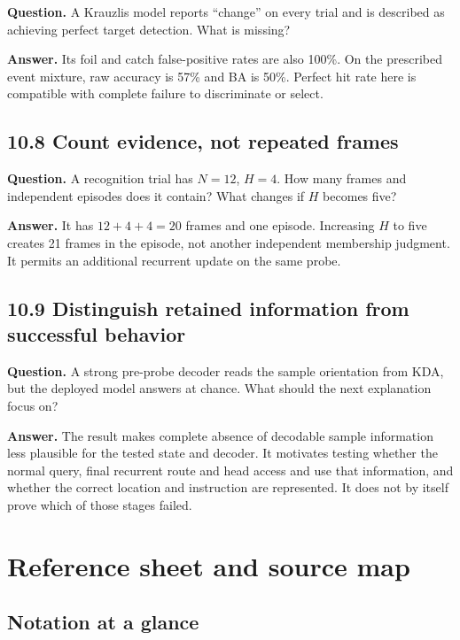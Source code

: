 \documentclass[
  11pt,
]{article}
\let\oldsubsection\subsection
\renewcommand{\subsection}{\Needspace{6\baselineskip}\oldsubsection}
\begin{document}
\textbf{Question.} A Krauzlis model reports ``change'' on every trial
and is described as achieving perfect target detection. What is missing?

\textbf{Answer.} Its foil and catch false-positive rates are also 100\%.
On the prescribed event mixture, raw accuracy is 57\% and BA is 50\%.
Perfect hit rate here is compatible with complete failure to
discriminate or select.

\subsection{10.8 Count evidence, not repeated
frames}\label{count-evidence-not-repeated-frames}

\textbf{Question.} A recognition trial has \(N=12\), \(H=4\). How many
frames and independent episodes does it contain? What changes if \(H\)
becomes five?

\textbf{Answer.} It has \(12+4+4=20\) frames and one episode. Increasing
\(H\) to five creates 21 frames in the episode, not another independent
membership judgment. It permits an additional recurrent update on the
same probe.

\subsection{10.9 Distinguish retained information from successful
behavior}\label{distinguish-retained-information-from-successful-behavior}

\textbf{Question.} A strong pre-probe decoder reads the sample
orientation from KDA, but the deployed model answers at chance. What
should the next explanation focus on?

\textbf{Answer.} The result makes complete absence of decodable sample
information less plausible for the tested state and decoder. It
motivates testing whether the normal query, final recurrent route and
head access and use that information, and whether the correct location
and instruction are represented. It does not by itself prove which of
those stages failed.

\newpage

\section{Reference sheet and source
map}\label{reference-sheet-and-source-map}

\subsection{Notation at a glance}\label{notation-at-a-glance}
\end{document}
